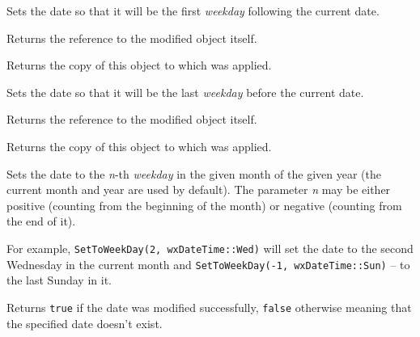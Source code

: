 \label{wxdatetimesettonextweekday}


Sets the date so that it will be the first {\it weekday} following the current
date.

Returns the reference to the modified object itself.


\label{wxdatetimegetnextweekday}


Returns the copy of this object to which
 was applied.


\label{wxdatetimesettoprevweekday}


Sets the date so that it will be the last {\it weekday} before the current
date.

Returns the reference to the modified object itself.


\label{wxdatetimegetprevweekday}


Returns the copy of this object to which
 was applied.


\label{wxdatetimesettoweekday}


Sets the date to the {\it n}-th {\it weekday} in the given month of the given
year (the current month and year are used by default). The parameter {\it n}
may be either positive (counting from the beginning of the month) or negative
(counting from the end of it).

For example, {\tt SetToWeekDay(2, wxDateTime::Wed)} will set the date to the
second Wednesday in the current month and
{\tt SetToWeekDay(-1, wxDateTime::Sun)} -- to the last Sunday in it.

Returns {\tt true} if the date was modified successfully, {\tt false}
otherwise meaning that the specified date doesn't exist.



